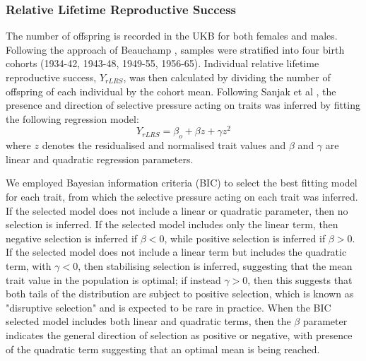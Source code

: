 \documentclass[12pt]{zHenriquesLab-StyleBioRxiv}
\begin{document}
\subsubsection*{Relative Lifetime Reproductive Success}
The number of offspring is recorded in the UKB for both females and
males. Following the approach of Beauchamp \cite{v_select2}, samples were 
stratified into four birth cohorts (1934-42, 1943-48, 1949-55, 1956-65). Individual relative
lifetime reproductive success, $Y_{rLRS}$, was then calculated by
dividing the number of offspring of each individual by the cohort
mean. Following Sanjak et al \cite{Sanjak2018}, the presence and
direction of selective pressure acting on traits was inferred by
fitting the following regression model:
\begin{equation}
Y_{rLRS} = \beta_o + \beta z + \gamma z^2 \label{math:LRS}
\end{equation}
where $z$ denotes the residualised and normalised trait values and
$\beta$ and $\gamma$ are linear and quadratic regression parameters.

We employed Bayesian information criteria (BIC) to select the best
fitting model for each trait, from which the selective pressure acting
on each trait was inferred. If the selected model does not include a linear
or quadratic parameter, then no selection is inferred. If the selected model
includes only the linear term, then negative selection is inferred if $\beta<0$, 
while positive selection is inferred if $\beta>0$. If the selected model does not 
include a linear term but includes the quadratic term, with $\gamma<0$, then 
stabilising selection is inferred, suggesting that the mean trait value in the 
population is optimal; if instead $\gamma>0$, then this suggests that 
both tails of the distribution are subject to positive selection, which is known as 
"disruptive selection" and is expected to be rare in practice. When the BIC selected 
model includes both linear and quadratic terms, then the $\beta$ parameter indicates 
the general direction of selection as positive or negative, with presence of the quadratic 
term suggesting that an optimal mean is being reached.
%
\end{document}
